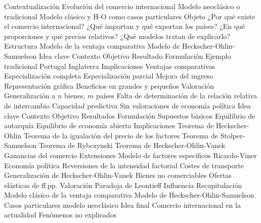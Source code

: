 \documentclass{nuevotema}
\begin{document}
\begin{esquema}[enumerate]
	\1[] 
		\2 Contextualización
			\3 Evolución del comercio internacional
			\3 Modelo neoclásico o tradicional
			\3 Modelo clásico y H-O como casos particulares
		\2 Objeto
			\3 ¿Por qué existe el comercio internacional?
			\3 ¿Qué importan y qué exportan los países?
			\3 ¿En qué proporciones y qué precios relativos?
			\3 ¿Qué modelos tratan de explicarlo?
		\2 Estructura
			\3 Modelo de la ventaja comparativa
			\3 Modelo de Heckscher-Ohlin-Samuelson
	\1 
		\2 Idea clave
			\3 Contexto
			\3 Objetivo
			\3 Resultado
		\2 Formulación
			\3 Ejemplo tradicional
			\3 Portugal
			\3 Inglaterra
		\2 Implicaciones
			\3 Ventajas comparativas
			\3 Especialización completa
			\3 Especialización parcial
			\3 Mejora del ingreso
			\3 Representación gráfica
			\3 Beneficios en grandes y pequeños
		\2 Valoración
			\3 Generalización a $n$ bienes, $m$ países
			\3 Falta de determinación de la relación relativa de intercambio
			\3 Capacidad predictiva
			\3 Sin valoraciones de economía política
	\1 
		\2 Idea clave
			\3 Contexto
			\3 Objetivo
			\3 Resultados
		\2 Formulación
			\3 Supuestos básicos
			\3 Equilibrio de autarquía
			\3 Equilibrio de economía abierta
		\2 Implicaciones
			\3 Teorema de Heckscher-Ohlin
			\3 Teorema de la igualación del precio de los factores
			\3 Teorema de Stolper-Samuelson
			\3 Teorema de Rybczynski
			\3 Teorema de Heckscher-Ohlin-Vanek
			\3 Ganancias del comercio
		\2 Extensiones
			\3 Modelo de factores específicos Ricardo-Viner
			\3 Economía política
			\3 Reversiones de la intensidad factorial
			\3 Costes de transporte
			\3 Generalización de Heckscher-Ohlin-Vanek
			\3 Bienes no comerciables
			\3 Ofertas elásticas de ff.pp.
		\2 Valoración
			\3 Paradoja de Leontieff
			\3 Influencia
	\1[] 
		\2 Recapitulación
			\3 Modelo clásico de la ventaja comparativa
			\3 Modelo de Heckscher-Ohlin-Samuelson
			\3[$\then$] Casos particulares modelo neoclásico
		\2 Idea final
			\3 Comercio internacional en la actualidad
			\3 Fenómenos no explicados

\end{esquema}

\esquemalargo
\end{document}

